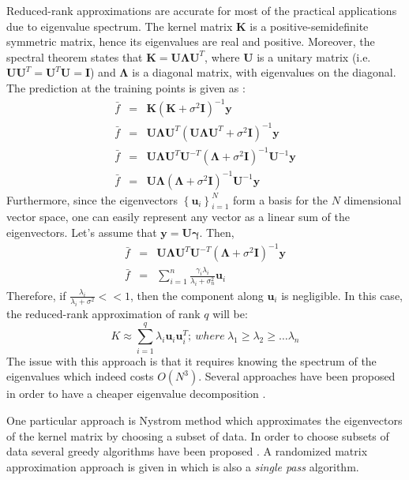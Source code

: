 \documentclass{article}
\begin{document}
Reduced-rank approximations are accurate for most of the practical applications due to eigenvalue spectrum. The kernel matrix $\mathbf{K}$ is a positive-semidefinite symmetric matrix, hence its eigenvalues are real and positive. Moreover, the spectral theorem states that $\mathbf{K}=\mathbf{U\Lambda U}^T$, where $\mathbf{U}$ is a unitary matrix (i.e. $\mathbf{U}\mathbf{U}^T=\mathbf{U}^T\mathbf{U}=\mathbf{I}$) and $\mathbf{\Lambda}$ is a diagonal matrix, with eigenvalues on the diagonal. The prediction at the training points is given as :
\begin{eqnarray}
\bar{f}&=&\mathbf{K}(\mathbf{K}+\sigma^2\mathbf{I})^{-1}\mathbf{y} \nonumber \\
\bar{f}&=&\mathbf{U\Lambda U}^T(\mathbf{U\Lambda U}^T+\sigma^2\mathbf{I})^{-1}\mathbf{y} \nonumber \\
\bar{f}&=& \mathbf{U\Lambda U}^T\mathbf{U}^{-T}(\mathbf{\Lambda}+\sigma^2\mathbf{I})^{-1}\mathbf{U}^{-1}\mathbf{y} \nonumber \\
\bar{f}&=& \mathbf{U\Lambda}(\mathbf{\Lambda}+\sigma^2\mathbf{I})^{-1}\mathbf{U}^{-1}\mathbf{y} 
\end{eqnarray}
Furthermore, since the eigenvectors $\left\{\mathbf{u}_i\right\}_{i=1}^N$ form a basis for the $N$ dimensional vector space, one can easily represent any vector as a linear sum of the eigenvectors. Let's assume that $\mathbf{y}=\mathbf{U}\mathbf{\gamma}$. Then,
\begin{eqnarray}
\bar{f}&=& \mathbf{U\Lambda U}^T\mathbf{U}^{-T}(\mathbf{\Lambda}+\sigma^2\mathbf{I})^{-1}\mathbf{y}  \nonumber \\
\bar{f}&=&\sum_{i=1}^n\frac{\gamma_i\lambda_i}{\lambda_i+\sigma_n^2}\mathbf{u}_i
\end{eqnarray}
Therefore, if $\frac{\lambda_i}{\lambda_i+\sigma^2}<<1$, then the component along $\mathbf{u}_i$ is negligible. In this case, the reduced-rank approximation of rank $q$ will be:
\begin{equation}
K\approx \sum_{i=1}^q \lambda_i \mathbf{u}_i \mathbf{u}_i^T; \> where \> \lambda_1\geq \lambda_2 \geq \dots \lambda_n
\end{equation}
The issue with this approach is that it requires knowing the spectrum of the eigenvalues which indeed costs $O(N^3)$.  Several approaches have been proposed in order to have a cheaper eigenvalue decomposition \cite{rasmussen06}. 

One particular approach is Nystrom method which approximates the eigenvectors of the kernel matrix by choosing a subset of data. In order to choose subsets of data several greedy algorithms have been proposed \cite{rasmussen06} \cite{smolaGreedy}. A randomized matrix approximation approach is given in \cite{RandomizedMatrixDecompose} which is also a \textit{single pass} algorithm. 
\end{document}
